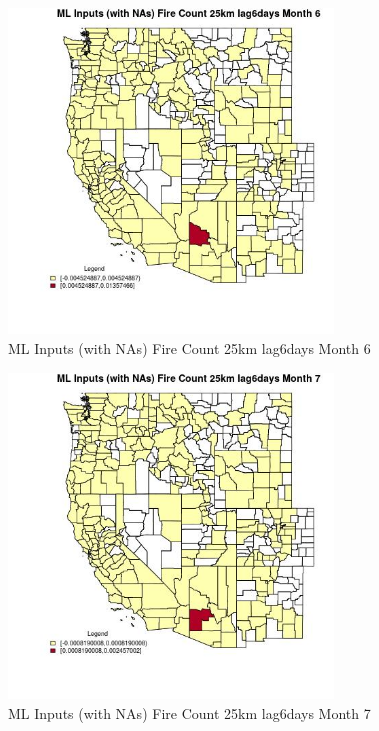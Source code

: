 \begin{figure} 
\centering  
\includegraphics[width=0.77\textwidth]{Code_Outputs/Report_ML_input_PM25_Step4_part_e_de_duplicated_aves_compiled_2019-05-21wNAs_CountyFire_Count_25km_lag6daysmedianMonth6.jpg} 
\caption{\label{fig:Report_ML_input_PM25_Step4_part_e_de_duplicated_aves_compiled_2019-05-21wNAsCountyFire_Count_25km_lag6daysmedianMonth6}ML Inputs (with NAs) Fire Count 25km lag6days Month 6} 
\end{figure} 
 

\begin{figure} 
\centering  
\includegraphics[width=0.77\textwidth]{Code_Outputs/Report_ML_input_PM25_Step4_part_e_de_duplicated_aves_compiled_2019-05-21wNAs_CountyFire_Count_25km_lag6daysmedianMonth7.jpg} 
\caption{\label{fig:Report_ML_input_PM25_Step4_part_e_de_duplicated_aves_compiled_2019-05-21wNAsCountyFire_Count_25km_lag6daysmedianMonth7}ML Inputs (with NAs) Fire Count 25km lag6days Month 7} 
\end{figure} 
 

